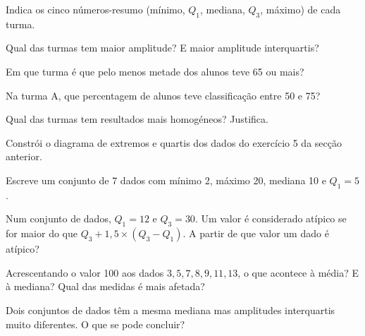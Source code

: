 \documentclass[12pt]{article}
\begin{document}
\begin{center}
\end{center}

\begin{exercicios}
  \item Indica os cinco números-resumo (mínimo, $Q_1$, mediana, $Q_3$, máximo) de cada turma.
  \item Qual das turmas tem maior amplitude? E maior amplitude interquartis?
  \item Em que turma é que pelo menos metade dos alunos teve 65 ou mais?
  \item Na turma A, que percentagem de alunos teve classificação entre 50 e 75?
  \item Qual das turmas tem resultados mais homogéneos? Justifica.
  \item Constrói o diagrama de extremos e quartis dos dados do exercício 5 da secção anterior.
\end{exercicios}

\begin{exercicios}
  \item Escreve um conjunto de 7 dados com mínimo 2, máximo 20, mediana 10 e $Q_1 = 5$.
  \item Num conjunto de dados, $Q_1 = 12$ e $Q_3 = 30$. Um valor é considerado atípico se for maior do que $Q_3 + 1{,}5 \times (Q_3 - Q_1)$. A partir de que valor um dado é atípico?
  \item Acrescentando o valor 100 aos dados $3, 5, 7, 8, 9, 11, 13$, o que acontece à média? E à mediana? Qual das medidas é mais afetada?
  \item Dois conjuntos de dados têm a mesma mediana mas amplitudes interquartis muito diferentes. O que se pode concluir?
\end{exercicios}
\end{document}
